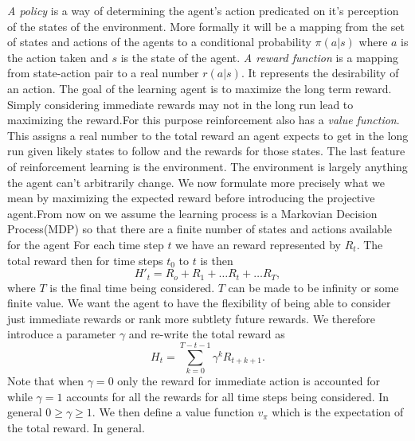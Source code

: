 \documentclass[twocolumn,prX,longbibliography]{revtex4}
\begin{document}
\textit{A policy} is a way of determining the agent's action predicated on it's perception of the states of the environment. More formally it will be a mapping from the set of states and actions of the agents to a conditional probability \( \pi(a|s) \) where \(a\) is the action taken and \(s\) is the state of the agent.\newline
\indent \textit{A reward function} is a mapping from state-action pair to a real number \(r(a|s)\). It represents the desirability of an action. The goal of the learning agent is to maximize the long term reward. \newline
\indent Simply considering immediate rewards may not in the long run lead to maximizing the reward.For this purpose reinforcement also has a \textit{value function}. This assigns a real number to the total reward an agent expects to get in the long run given likely states to follow and the rewards for those states. \newline
\indent The last feature of reinforcement learning is the environment. The environment is largely anything the agent can't arbitrarily change.\newline
\indent We now formulate more precisely what we mean by maximizing the expected reward before introducing the projective agent.From now on we assume the learning process is a Markovian Decision Process(MDP) so that there are a finite number of states and actions available for the agent\newline
For each time step \(t\) we have an reward represented by \(R_t\). The total reward then for time steps \(t_0\) to \(t\) is then
\begin{equation}
 H'_t = R_o + R_1 + \dots R_t + \dots R_T,
\end{equation}
where \(T\) is the final time being considered. \(T\) can be made to be infinity or some finite value. We want the agent to have the flexibility of being able to consider just immediate rewards or rank more subtlety future rewards. We therefore introduce a parameter \( \gamma \) and re-write the total reward as
\begin{equation}
  H_t = \sum_{k=0}^{T-t-1} \gamma^k R_{t+k+1}.
\end{equation} 
Note that when \( \gamma =0 \) only the reward for immediate action is accounted for while \(\gamma = 1\) accounts for all the rewards for all time steps being considered. In general \( 0 \geq \gamma \geq 1 \). We then define a value function \(v_{\pi}\) which is the expectation of the total reward. In general.
\end{document}
